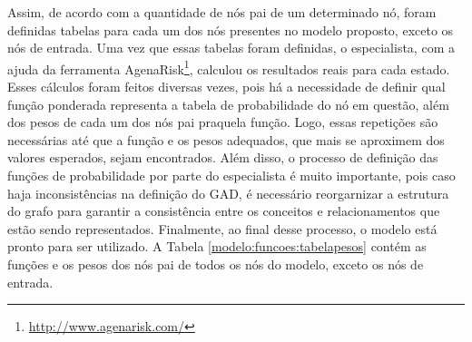 Assim, de acordo com a quantidade de nós pai de um determinado nó, foram definidas tabelas para cada um dos nós presentes no modelo proposto, exceto os nós de entrada. Uma vez que essas tabelas foram definidas, o especialista, com a ajuda da ferramenta AgenaRisk\footnote{\url{http://www.agenarisk.com/}}, calculou os resultados reais para cada estado. Esses cálculos foram feitos diversas vezes, pois há a necessidade de definir qual função ponderada representa a tabela de probabilidade do nó em questão, além dos pesos de cada um dos nós pai praquela função. Logo, essas repetições são necessárias até que a função e os pesos adequados, que mais se aproximem dos valores esperados, sejam encontrados. Além disso, o processo de definição das funções de probabilidade por parte do especialista é muito importante, pois caso haja inconsistências na definição do GAD, é necessário reorgarnizar a estrutura do grafo para garantir a consistência entre os conceitos e relacionamentos que estão sendo representados. Finalmente, ao final desse processo, o modelo está pronto para ser utilizado. A Tabela \ref{modelo:funcoes:tabelapesos} contém as funções e os pesos dos nós pai de todos os nós do modelo, exceto os nós de entrada.

